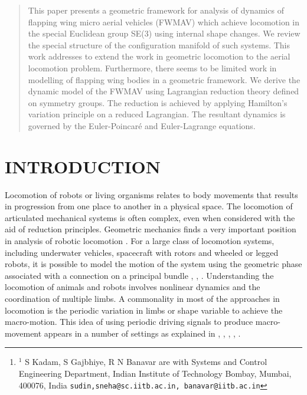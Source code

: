 \documentclass[letterpaper, 10 pt, conference]{ieeeconf}  \newcommand{\RN}[1]{\textup{\uppercase\expandafter{\romannumeral#1}}}
\author{S. Kadam$^{1}$, S. Gajbhiye$^{1}$ and R. N. Banavar$^{1}$\thanks{$^{1}$
S Kadam, S Gajbhiye, R N Banavar are with Systems and Control Engineering Department, Indian Institute of Technology Bombay,
        Mumbai, 400076, India
        {\tt\small sudin,sneha@sc.iitb.ac.in, banavar@iitb.ac.in}}}
\begin{document}
\maketitle
\thispagestyle{empty}
\pagestyle{empty}
\begin{abstract}
This paper presents a geometric framework for analysis of dynamics of flapping wing micro aerial vehicles (FWMAV) which achieve locomotion in the special Euclidean group SE(3) using internal shape changes. We review the special structure of the configuration manifold of such systems. This work addresses to extend the work in geometric locomotion to the aerial locomotion problem. Furthermore, there seems to be limited work in modelling of flapping wing bodies in a geometric framework. We derive the dynamic model of the FWMAV using Lagrangian reduction theory defined on symmetry groups. The reduction is achieved by applying Hamilton's variation principle on a reduced Lagrangian. The resultant dynamics is governed by the Euler-Poincar\'{e} and Euler-Lagrange equations.

\end{abstract}

\section{INTRODUCTION}

Locomotion of robots or living organisms relates to body movements that results in progression from one place to another in a physical space. The locomotion of articulated mechanical systems is often complex, even when considered with the aid of reduction principles. Geometric mechanics finds a very important position in analysis of robotic locomotion \cite{Bloch book}. For a large class of locomotion systems, including underwater vehicles, spacecraft with rotors and wheeled or legged robots, it is possible to model the motion of the system using the geometric phase associated with a connection on a principal bundle  \cite{liang}, \cite{cabrera}, \cite{marsden_krishna_bloch}. Understanding the locomotion of animals and robots involves nonlinear dynamics and the coordination of multiple limbs. A commonality in most of the approaches in locomotion is the periodic variation in limbs or shape variable to achieve the macro-motion. This idea of using periodic driving signals to produce macro-movement appears in a number of settings as explained in \cite{liang}, \cite{cabrera}, \cite{Fairchild beanie}, \cite{Chung dorothy}, \cite{Kuang robobat}.
\end{document}
